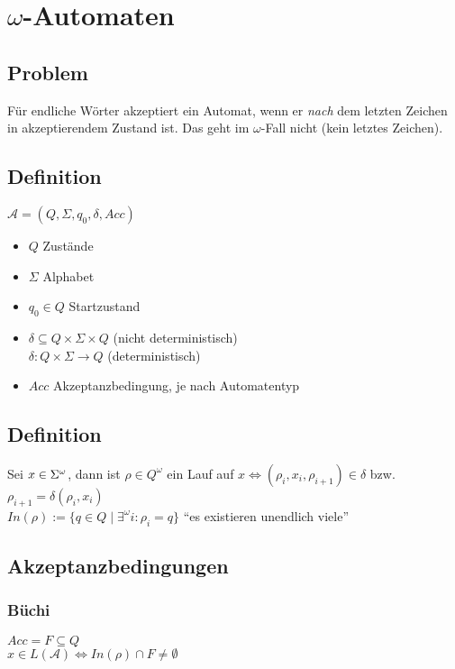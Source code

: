 \section{$\omega$-Automaten}
    \subsection{Problem}
        Für endliche Wörter akzeptiert ein Automat, wenn er \emph{nach} dem letzten Zeichen in akzeptierendem Zustand ist. Das geht im $\omega$-Fall nicht (kein letztes Zeichen).
    \subsection{Definition}
        $\mathcal{A}=\left(Q,\Sigma,q_0,\delta,Acc\right)$
        \begin{itemize}
            \item $Q$ Zustände
            \item $\Sigma$ Alphabet
            \item $q_0\in Q$ Startzustand
            \item $\delta\subseteq Q\times\Sigma\times Q$ (nicht deterministisch)\\$\delta: Q\times\Sigma\rightarrow Q$ (deterministisch)
            \item $Acc$ Akzeptanzbedingung, je nach Automatentyp
        \end{itemize}
    \subsection{Definition}
        Sei $x\in\Sigma^{\omega}$, dann ist $\rho\in Q^\omega$ ein Lauf auf $x\Leftrightarrow (\rho_i,x_i,\rho_{i+1})\in\delta$ bzw. $\rho_{i+1}=\delta(\rho_i,x_i)$\\
        $In(\rho):=\{q\in Q\mid \exists^\omega i: \rho_i=q\}$ ``es existieren unendlich viele''
    \subsection{Akzeptanzbedingungen}
        \subsubsection{Büchi}
            $Acc=F\subseteq Q$\\
            $x\in L(\mathcal{A})\Leftrightarrow In(\rho)\cap F\not=\emptyset$\\
            \vspace*{-2cm}\\\hspace*{7cm}
